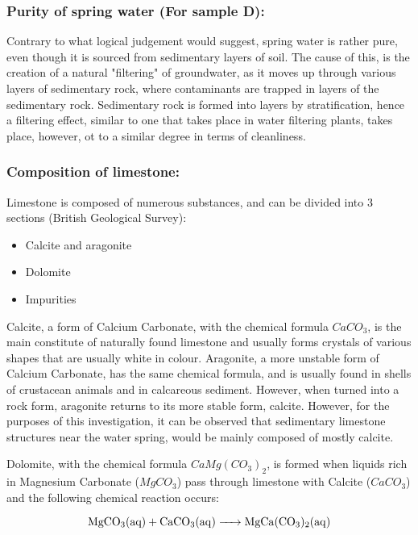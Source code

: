 \documentclass[11pt, a4]{article}
\begin{document}
			\subsubsection{Purity of spring water (For sample D):}

				Contrary to what logical judgement would suggest, spring water is rather pure, even though it is sourced from sedimentary layers of soil. The cause of this, is the creation of a natural "filtering" of groundwater, as it moves up through various layers of sedimentary rock, where contaminants are trapped in layers of the sedimentary rock. Sedimentary rock is formed into layers by stratification, hence a filtering effect, similar to one that takes place in water filtering plants, takes place, however, ot to a similar degree in terms of cleanliness.

			\subsubsection{Composition of limestone:}

				Limestone is composed of numerous substances, and can be divided into 3 sections (British Geological Survey):

				\begin{itemize}
					\item Calcite and aragonite
					\item Dolomite
					\item Impurities
				\end{itemize}

				Calcite, a form of Calcium Carbonate, with the chemical formula $CaCO_3$, is the main constitute of naturally found limestone and usually forms crystals of various shapes that are usually white in colour. Aragonite, a more unstable form of Calcium Carbonate, has the same chemical formula, and is usually found in shells of crustacean animals and in calcareous sediment. However, when turned into a rock form, aragonite returns to its more stable form, calcite. However, for the purposes of this investigation, it can be observed that sedimentary limestone structures near the water spring, would be mainly composed of mostly calcite.

				Dolomite, with the chemical formula $CaMg(CO_3)_2$, is formed when liquids rich in Magnesium Carbonate ($MgCO_3$) pass through limestone with Calcite ($CaCO_3$) and the following chemical reaction occurs:

				\begin{equation}
					\ce{MgCO_3{(aq)} + CaCO_3(aq) -> MgCa(CO_3)_2(aq)}
				\end{equation}
				
\end{document}
